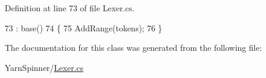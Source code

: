 Definition at line 73 of file Lexer.\-cs.


\begin{DoxyCode}
73                                                  : base()
74         \{
75             AddRange(tokens);
76         \}
\end{DoxyCode}


The documentation for this class was generated from the following file\-:\begin{DoxyCompactItemize}
\item 
Yarn\-Spinner/\hyperlink{a00310}{Lexer.\-cs}\end{DoxyCompactItemize}
